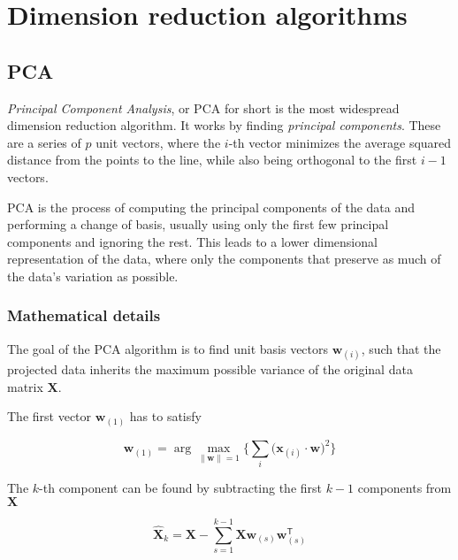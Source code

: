 \chapter{Dimension reduction algorithms}\label{ch:dimension-reduction-algorithms}




\section{PCA}\label{sec:pca}

\textit{Principal Component Analysis}\cite{bib:pca}, or PCA for short is the most widespread dimension reduction algorithm. It works by finding \textit{principal components}. These are a series of $p$ unit vectors, where the $i$-th vector minimizes the average squared distance from the points to the line, while also being orthogonal to the first $i - 1$ vectors.

PCA is the process of computing the principal components of the data and performing a change of basis, usually using only the first few principal components and ignoring the rest. This leads to a lower dimensional representation of the data, where only the components that preserve as much of the data's variation as possible.

\subsection{Mathematical details}\label{subsec:mathematical-details}

The goal of the PCA algorithm is to find unit basis vectors $\mathbf{w}_{(i)}$, such that the projected data inherits the maximum possible variance of the original data matrix $\mathbf{X}$.

The first vector $\mathbf{w}_{(1)}$ has to satisfy

\begin{equation}
	\mathbf{w}_{(1)} = \arg\max_{\lVert \mathbf{w} \rVert = 1}{ \Bigg\{ \sum_i{ \big(\mathbf{x}_{(i)} \cdot \mathbf{w} \big)^2 } \Bigg\} }
	\label{eq:pca:w1}
\end{equation}

The $k$-th component can be found by subtracting the first $k - 1$ components from $\mathbf{X}$

\begin{equation}
	\mathbf{\hat {X}}_{k}=\mathbf{X}-\sum_{s=1}^{k-1}\mathbf{X}\mathbf{w}_{(s)}\mathbf{w}_{(s)}^{\mathsf{T}}
	\label{eq:pca_xhat}
\end{equation}

